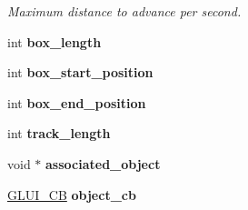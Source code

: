 \begin{DoxyCompactItemize}
\begin{DoxyCompactList}\small\item\em Maximum distance to advance per second. \end{DoxyCompactList}\item 
\hypertarget{classGLUI__Scrollbar_a9970e334cae062771414f55c0b846270}{int {\bfseries box\-\_\-length}}\label{classGLUI__Scrollbar_a9970e334cae062771414f55c0b846270}

\item 
\hypertarget{classGLUI__Scrollbar_a6b7284df7537af88d8acdd643f807210}{int {\bfseries box\-\_\-start\-\_\-position}}\label{classGLUI__Scrollbar_a6b7284df7537af88d8acdd643f807210}

\item 
\hypertarget{classGLUI__Scrollbar_a75a697d414c0efe18070ca93a0961091}{int {\bfseries box\-\_\-end\-\_\-position}}\label{classGLUI__Scrollbar_a75a697d414c0efe18070ca93a0961091}

\item 
\hypertarget{classGLUI__Scrollbar_afdbce9591fda4c231f926d0f737b2dad}{int {\bfseries track\-\_\-length}}\label{classGLUI__Scrollbar_afdbce9591fda4c231f926d0f737b2dad}

\item 
\hypertarget{classGLUI__Scrollbar_a64562211dfbeda1a831b87f5116e639d}{void $\ast$ {\bfseries associated\-\_\-object}}\label{classGLUI__Scrollbar_a64562211dfbeda1a831b87f5116e639d}

\item 
\hypertarget{classGLUI__Scrollbar_a16a50358fbc1f82d4c6932ea0eb93bef}{\hyperlink{classGLUI__CB}{G\-L\-U\-I\-\_\-\-C\-B} {\bfseries object\-\_\-cb}}\label{classGLUI__Scrollbar_a16a50358fbc1f82d4c6932ea0eb93bef}

\end{DoxyCompactItemize}
